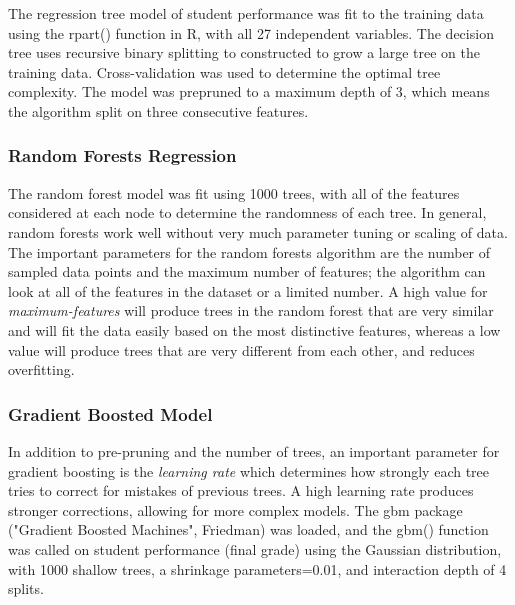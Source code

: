 \documentclass[sigconf]{acmart}
\begin{document}
The regression tree model of student performance was fit to the training data 
using the rpart() function in R, with all 27 independent variables. The decision
tree uses recursive binary splitting to constructed to grow a large tree on the 
training data. Cross-validation was used to determine the optimal tree complexity.
The model was prepruned to a maximum depth of 3, which means the algorithm split 
on three consecutive features.


\subsubsection{Random Forests Regression} 

The random forest model was fit using 1000 trees, with all of the features 
considered at each node to determine the randomness of each tree. In general,
random forests work well without very much parameter tuning or scaling of data. 
The important parameters for the random forests algorithm are the number of 
sampled data points and the maximum number of features; the algorithm can 
look at all of the features in the dataset or a limited number. A high value 
for \emph{maximum-features} will produce trees in the random forest that are 
very similar and will fit the data easily based on the most distinctive features, 
whereas a low value will produce trees that are very different from each other, 
and reduces overfitting. 


\subsubsection{Gradient Boosted Model} 

In addition to pre-pruning and the number of trees, an important parameter 
for gradient boosting is the \emph{learning rate} which determines how 
strongly each tree tries to correct for mistakes of previous trees. A high 
learning rate produces stronger corrections, allowing for more complex models. 
The gbm package ("Gradient Boosted Machines", Friedman) was loaded, and the 
gbm() function was called on student performance (final grade) using the 
Gaussian distribution, with 1000 shallow trees, a shrinkage parameters=0.01, 
and interaction depth of 4 splits. 

\end{document}
